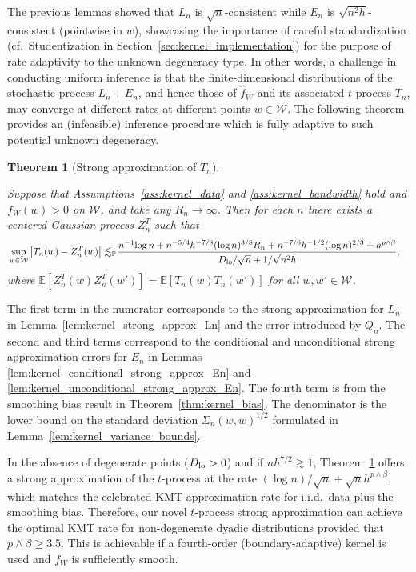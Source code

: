 \documentclass[11pt,lof]{puthesis}
\renewcommand{\P}{\ensuremath{\mathbb{P}}}
\newcommand{\E}{\ensuremath{\mathbb{E}}}
\newcommand{\cW}{\ensuremath{\mathcal{W}}}
\newcommand{\Dl}{\ensuremath{D_{\textup{lo}}}}
\theoremstyle{break}
\newtheorem{theorem}{Theorem}[section]
\theoremstyle{proof}
\begin{document}
The previous lemmas showed that $L_n$ is $\sqrt{n}$-consistent while $E_n$ is
$\sqrt{n^2h}$-consistent (pointwise in $w$), showcasing the importance of
careful standardization (cf.\ Studentization in
Section~\ref{sec:kernel_implementation}) for the purpose of rate adaptivity to
the
unknown degeneracy type. In other words, a challenge in conducting uniform
inference is that the finite-dimensional distributions of the stochastic
process $L_n+E_n$, and hence those of $\hat{f}_W$ and its associated
$t$-process $T_n$, may converge at different rates at different points
$w\in\cW$. The following theorem provides an (infeasible) inference procedure
which is fully adaptive to such potential unknown degeneracy.

\begin{theorem}[Strong approximation of $T_n$]
\label{thm:kernel_strong_approx_Tn}

Suppose that Assumptions~\ref{ass:kernel_data} and \ref{ass:kernel_bandwidth}
hold and $f_W(w) > 0$ on $\cW$, and take any $R_n \to \infty$. Then for each
$n$ there exists a centered Gaussian process $Z_n^{T}$ such that
%
\begin{align*}
&\sup_{w \in \cW} \left| T_n(w) - Z_n^{T}(w) \right|
\lesssim_\P \!
\frac{
n^{-1} \! \log n
+ n^{-5/4} h^{-7/8} (\log n)^{3/8} R_n
+ n^{-7/6} h^{-1/2} (\log n)^{2/3}
+ h^{p\wedge\beta}}
{\Dl/\sqrt{n} + 1/\sqrt{n^2h}},
\end{align*}
%
where $\E[Z_n^T(w)Z_n^T(w')] = \E[T_n(w)T_n(w')]$ for all $w,w' \in \cW$.
%
\end{theorem}

The first term in the numerator corresponds to the strong approximation for
$L_n$ in Lemma~\ref{lem:kernel_strong_approx_Ln} and the error introduced by
$Q_n$.
The second and third terms correspond to the conditional and unconditional
strong approximation errors for $E_n$ in Lemmas
\ref{lem:kernel_conditional_strong_approx_En} and
\ref{lem:kernel_unconditional_strong_approx_En}.
The fourth term is from
the smoothing bias result in Theorem~\ref{thm:kernel_bias}. The denominator is
the lower bound on the standard deviation $\Sigma_n(w,w)^{1/2}$ formulated in
Lemma~\ref{lem:kernel_variance_bounds}.

In the absence of degenerate points ($\Dl > 0$) and if $n h^{7/2}\gtrsim 1$,
Theorem~\ref{thm:kernel_strong_approx_Tn} offers a strong approximation of the
$t$-process at the rate $(\log n)/\sqrt{n}+\sqrt{n}h^{p\wedge\beta}$, which
matches the celebrated KMT approximation rate for i.i.d.\ data plus the
smoothing bias. Therefore, our novel $t$-process strong approximation can
achieve the optimal KMT rate for non-degenerate dyadic distributions provided
that $p\wedge\beta \geq 3.5$. This is achievable if a fourth-order
(boundary-adaptive) kernel is used and $f_W$ is sufficiently smooth.
\end{document}
